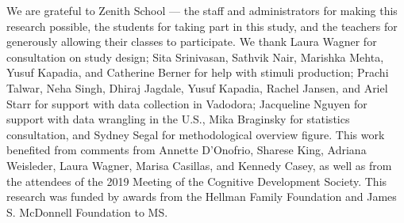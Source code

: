 \documentclass{foushee-adapted-preprint}
\begin{document}
\begin{acknowledgements}
\noindent We are grateful to Zenith School — the staff and administrators for making this research possible, the students for taking part in this study, and the teachers for generously allowing their classes to participate. We thank Laura Wagner for consultation on study design; Sita Srinivasan, Sathvik Nair, Marishka Mehta, Yusuf Kapadia, and Catherine Berner for help with stimuli production; Prachi Talwar, Neha Singh, Dhiraj Jagdale, Yusuf Kapadia, Rachel Jansen, and Ariel Starr for support with data collection in Vadodora; Jacqueline Nguyen for support with data wrangling in the U.S., Mika Braginsky for statistics consultation, and Sydney Segal for methodological overview figure. This work benefited from comments from Annette D’Onofrio, Sharese King, Adriana Weisleder, Laura Wagner, Marisa Casillas, and Kennedy Casey, as well as from the attendees of the 2019 Meeting of the Cognitive Development Society. This research was funded by awards from the Hellman Family Foundation and James S. McDonnell Foundation to MS.
\end{acknowledgements}

\printbibliography
%
%
%
%
%
%
\end{document}
